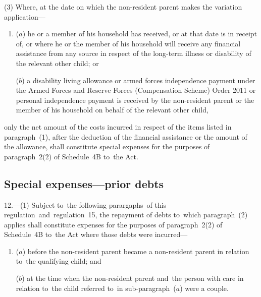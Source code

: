 \documentclass[12pt,a4paper]{article}
\begin{document}
(3) Where, at the date on which the non-resident parent makes the variation application—
\begin{enumerate}\item[]
($a$) he or a member of his household has received, or at that date is in receipt of, or where he or the member of his household will receive any financial assistance from any source in respect of the long-term illness or disability of the relevant other child; or

($b$) a disability living allowance 
or armed forces independence payment under the Armed Forces and Reserve Forces (Compensation Scheme) Order 2011  %
or personal independence payment  %
is received by the non-resident parent or the member of his household on behalf of the relevant other child,
\end{enumerate}
only the net amount of the costs incurred in respect of the items listed in paragraph~(1), after the deduction of the financial assistance or the amount of the allowance, shall constitute special expenses for the purposes of paragraph~2(2) of Schedule~4B to~the Act.


\subsection[12. Special expenses—prior debts]{Special expenses—prior debts}

12.---(1)  Subject to~the following parargaphs~of this regulation~and~regulation~15, the repayment of debts to~which paragraph~(2) applies shall constitute expenses for the purposes of paragraph~2(2) of Schedule~4B to~the Act where those debts were incurred—
\begin{enumerate}\item[]
($a$) before the non-resident parent became a non-resident parent in relation to~the qualifying child; and

($b$) at the time when the non-resident parent and~the person with care in relation to~the child referred to~in sub-paragraph~($a$)  were a couple.
\end{enumerate}
\end{document}
